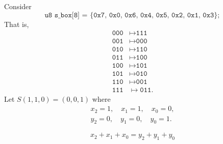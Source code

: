 \newpage
\begin{example}
Consider \[
\texttt{u8 s\_box[8] = \{0x7, 0x0, 0x6, 0x4, 0x5, 0x2, 0x1, 0x3\}};
\] That is, \begin{align*}
\texttt{000}&\mapsto\texttt{111}\\
\texttt{001}&\mapsto\texttt{000}\\
\texttt{010}&\mapsto\texttt{110}\\
\texttt{011}&\mapsto\texttt{100}\\
\texttt{100}&\mapsto\texttt{101}\\
\texttt{101}&\mapsto\texttt{010}\\
\texttt{110}&\mapsto\texttt{001}\\
\texttt{111}&\mapsto\texttt{011}.
\end{align*} Let $S(1,1,0) = (0,0,1)$ where \begin{align*}
x_2=1,\quad x_1=1,\quad  x_0=0,\\
y_2=0,\quad y_1=0,\quad  y_0=1.
\end{align*}

\[
x_2+x_1+x_0=y_2+y_1+y_0
\]

\end{example}
